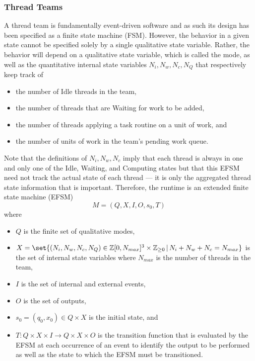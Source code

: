 \documentclass{article}
\newcommand{\Z}                 {{\mathbb Z}}
\newcommand{\taskroutine}        {task routine\xspace}
\begin{document}
\subsubsection{Thread Teams}
A thread team is fundamentally event-driven software and as such its design has
been specified as a finite state machine (FSM).  However, the behavior in a
given state cannot be specified solely by a single qualitative state variable.
Rather, the behavior will depend on a qualitative state variable, which is
called the mode, as well as the quantitative internal state variables $N_i, N_w,
N_c, N_Q$ that respectively keep track of
\begin{itemize}
\item{the number of Idle threads in the team,}
\item{the number of threads that are Waiting for work to be added,}
\item{the number of threads applying a \taskroutine on a unit of work, and}
\item{the number of units of work in the team's pending work queue.}
\end{itemize}
Note that the definitions of $N_i, N_w, N_c$ imply that each thread is
always in one and only one of the Idle, Waiting, and Computing states but that
this EFSM need not track the actual state of each thread --- it is only the
aggregated thread state information that is important.  Therefore, the runtime
is an extended finite state machine (EFSM)
\[
M = (Q, X, I, O, s_0, T)
\]
where
\begin{itemize}
\item{$Q$ is the finite set of qualitative modes,}
\item{$X = \set{(N_i, N_w, N_c, N_Q) \in \Z[0,N_{max}]^3\times\Z_{\ge 0}\,|\,N_i + N_w + N_c =
N_{max}}$ is the set of internal state variables where $N_{max}$ is the
number of threads in the team,}
\item{$I$ is the set of internal and external events,}
\item{$O$ is the set of outputs,}
\item{$s_0 = (q_0, x_0) \in Q \times X$ is the initial state, and}
\item{$T : Q \times X \times I \to Q \times X \times O$ is the transition
function that is evaluated by the EFSM at each occurrence of an event to
identify the output to be performed as well as the state to which the EFSM must
be transitioned.}
\end{itemize}
\end{document}
